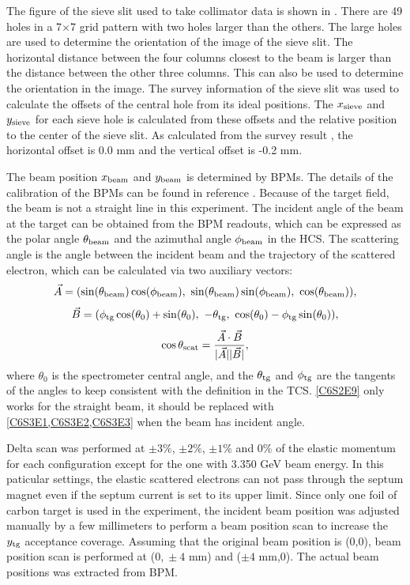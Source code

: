 The figure of the sieve slit used to take collimator data is shown in . There are 49 holes in a 7$\times$7 grid pattern with two holes larger than the others. The large holes are used to determine the orientation of the image of the sieve slit. The horizontal distance between the four columns closest to the beam is larger than the distance between the other three columns. This can also be used to determine the orientation in the image. The survey information of the sieve slit was used to calculate the offsets of the central hole from its ideal positions. The $x_{\mathrm{sieve}}$ and $y_{\mathrm{sieve}}$ for each sieve hole is calculated from these offsets and the relative position to the center of the sieve slit. As calculated from the survey result \cite{SurveyA1453,SurveyA1465}, the horizontal offset is 0.0 mm and the vertical offset is -0.2 mm.

The beam position $x_{\mathrm{beam}}$ and $y_{\mathrm{beam}}$ is determined by BPMs. The details of the calibration of the BPMs can be found in reference \cite{Zhu2016}. Because of the target field, the beam is not a straight line in this experiment. The incident angle of the beam at the target can be obtained from the BPM readouts, which can be expressed as the polar angle $\theta_{\mathrm{beam}}$ and the azimuthal angle $\phi_{\mathrm{beam}}$ in the HCS. The scattering angle is the angle between the incident beam and the trajectory of the scattered electron, which can be calculated via two auxiliary vectors:
\begin{equation} \label{C6S3E1}
\vec{A} = (\sin(\optt{beam})\cos(\optp{beam}),\ \sin(\optt{beam})\sin(\optp{beam}),\ \cos(\optt{beam})),
\end{equation}
\begin{equation} \label{C6S3E2}
\vec{B} = (\optp{tg}\cos(\theta_0)+\sin(\theta_0),\ -\optt{tg},\ \cos(\theta_0)-\optp{tg}\sin(\theta_0)),
\end{equation}
\begin{equation} \label{C6S3E3}
\cos\theta_{\mathrm{scat}} = \frac{\vec{A}\cdot\vec{B}}{|\vec{A}||\vec{B}|},
\end{equation}
where $\theta_0$ is the spectrometer central angle, and the $\theta_{\mathrm{tg}}$ and $\phi_{\mathrm{tg}}$ are the tangents of the angles to keep consistent with the definition in the TCS. \cref{C6S2E9} only works for the straight beam, it should be replaced with \cref{C6S3E1,C6S3E2,C6S3E3} when the beam has incident angle.

Delta scan was performed at $\pm 3\%$, $\pm 2\%$, $\pm 1\%$ and $0\%$ of the elastic momentum for each configuration except for the one with 3.350 GeV beam energy. In this paticular settings, the elastic scattered electrons can not pass through the septum magnet even if the septum current is set to its upper limit. Since only one foil of carbon target is used in the experiment, the incident beam position was adjusted manually by a few millimeters to perform a beam position scan to increase the $y_{\mathrm{tg}}$ acceptance coverage. Assuming that the original beam position is (0,0), beam position scan is performed at (0,$\ \pm 4$ mm) and ($\pm 4$ mm,0). The actual beam positions was extracted from BPM.

